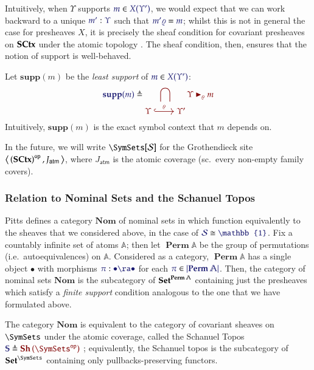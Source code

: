 \documentclass[11pt]{article}
\theoremstyle{definition}
\theoremstyle{remark}
\numberwithin{equation}{section}
\newcommand\Supp[1]{\mathbf{supp}(#1)}
\newcommand\SupportsUnmoded[3]{#1 \blacktriangleright_{#2} #3}
\newcommand\Sheaves[1]{\mathbf{Sh}\left(#1\right)}
\newcommand\SCtxSite{\SymSets[\Sorts]}
\DeclareMathOperator{\Perm}{\mathbf{Perm}}
\begin{document}
Intuitively, when $\Upsilon$ supports $\Member{m}{X(\Upsilon')}$, we would
expect that we can work backward to a unique $\Of{m'}{\Upsilon}$ such that
$\IsEq{m'\varrho}{m}$; whilst this is not in general the case for presheaves
$X$, it is precisely the sheaf condition for covariant presheaves on $\mathbf{SCtx}$
under the atomic topology \cite[p.~126]{mac-lane-moerdijk:1992}. The sheaf
condition, then, ensures that the notion of support is well-behaved.

Let $\Supp{m}$ be the \emph{least support} of $\Member{m}{X(\Upsilon')}$:
\[
  \Define{\Supp{m}}{
    \bigcap_{
      \begin{tikzcd}[cramped, ampersand replacement = \&]
        \Upsilon\arrow[r, hook, "\varrho"] \& \Upsilon'
      \end{tikzcd}
    }
    \SupportsUnmoded{\Upsilon}{\varrho}{m}
  }
\]
Intuitively, $\Supp{m}$ is the exact symbol context that $m$ depends on.

In the future, we will write $\SCtxSite$ for the Grothendieck site
$\left\langle\,\left(\mathbf{SCtx}\right)^{\mathtt{op}},J_\mathsf{atm}\,\right\rangle$, where $J_\mathsf{atm}$
is the atomic coverage (sc.\ every non-empty family covers).

\subsubsection{Relation to Nominal Sets and the Schanuel Topos}

Pitts defines a category $\mathbf{Nom}$ of nominal sets in \cite{pitts:2013}
which function equivalently to the sheaves that we considered above, in the
case of $\IMode{\Sorts}\cong\IMode{\mathbb{1}}$. Fix a countably infinite set
of atoms $\mathbb{A}$; then let $\Perm\mathbb{A}$ be the group of permutations
(i.e.\ autoequivalences) on $\mathbb{A}$.  Considered as a category,
$\Perm\mathbb{A}$ has a single object $\bullet$ with morphisms
$\Of{\pi}{\bullet\ra\bullet}$ for each $\Member{\pi}{\Dom{\Perm\mathbb{A}}}$.
Then, the category of nominal sets $\mathbf{Nom}$ is the subcategory of
$\Sets^{\Perm\mathbb{A}}$ containing just the presheaves which satisfy a
\emph{finite support} condition analogous to the one that we have formulated
above.

The category $\mathbf{Nom}$ is equivalent to the category of covariant sheaves
on $\SymSets$ under the atomic coverage, called the Schanuel Topos
$\Define{\mathbb{S}}{\Sheaves{\OpCat{\SymSets}}}$ \cite{pitts:2013,
fiore-staton:2006}; equivalently, the Schanuel topos is the subcategory of
$\Sets^\SymSets$ containing only pullbacks-preserving functors.
\end{document}
